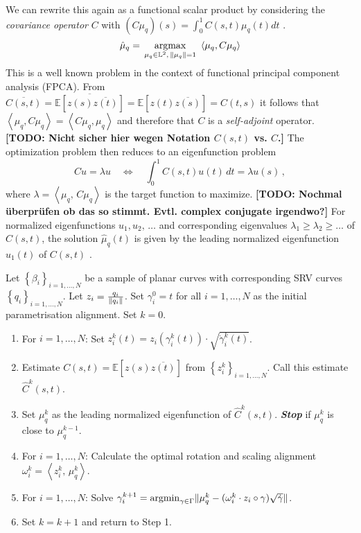 We can rewrite this again as a functional scalar product by considering the \emph{covariance operator} $C$ with $(C\mu_q)(s) = \int_0^1 C(s,t) \mu_q(t) dt$ \parencite[see][153]{RamsaySilverman2005}.
\begin{equation}
  \label{eq:quadr_opt}
  \hat\mu_q = \, \operatorname*{argmax}_{\mu_q \in \mathbb{L}^2,\,\lVert\mu_q\rVert = 1}\,\,
    \left\langle \mu_q, C\mu_q \right\rangle
\end{equation}
This is a well known problem in the context of functional principal component analysis (FPCA).
From $\overline{C(s,t)} = \overline{\mathbb{E}[z(s)\overline{z(t)}]} = \mathbb{E}[z(t)\overline{z(s)}] = C(t,s)$ it follows that $\left\langle \mu_q, C \mu_q \right\rangle = \left\langle C \mu_q, \mu_q \right\rangle$ and therefore that $C$ is a \emph{self-adjoint} operator.
\textbf{[TODO: Nicht sicher hier wegen Notation $C(s,t)$ vs. $C$.]}
The optimization problem then reduces to an eigenfunction problem 
$$ Cu = \lambda u \quad \Leftrightarrow \quad \int_0^1 C(s, t) u(t)\, dt = \lambda u(s)\,,$$
where $\lambda = \left\langle \mu_q,\, C \mu_q \right\rangle$ is the target function to maximize.
\textbf{[TODO: Nochmal überprüfen ob das so stimmt. Evtl. complex conjugate irgendwo?]}
For normalized eigenfunctions $u_1, u_2,\,\dots$ and corresponding eigenvalues $\lambda_1 \geq \lambda_2 \geq \dots$ of $C(s,t)$, the solution $\hat\mu_q(t)$ is given by the leading normalized eigenfunction $u_1(t)$ of $C(s,t)$ \parencite[see][153,397]{RamsaySilverman2005}.

\begin{algorithm}
  \label{algo:mean}
  Let $\left\{\beta_i\right\}_{i=1,\dots,N}$ be a sample of planar curves with corresponding SRV curves $\left\{ q_i \right\}_{i=1,\dots,N}$.
  Let $z_i = \frac{q_i}{\lVert q_i\rVert}$.
  Set $\gamma_i^0 = t$ for all $i=1,\dots,N$ as the initial parametrisation alignment.
  Set $k = 0$. 
  \begin{enumerate}
    \item For $i=1,\dots,N$: Set $z_i^k(t) = z_i\left(\gamma^k_i(t)\right) \cdot \sqrt{\dot\gamma_i^k(t)}$.
    \item Estimate $C(s,t) = \mathbb{E}[z(s)\overline{z(t)}]$ from $\left\{z_i^k\right\}_{i=1,\dots,N}$. Call this estimate $\hat{C}^k(s,t)$.
    \item Set $\mu_q^k$ as the leading normalized eigenfunction of $\hat{C}^k(s,t)$. \emph{\textbf{Stop}} if $\mu_q^k$ is close to $\mu_q^{k-1}$.
    \item For $i=1,\dots,N$: Calculate the optimal rotation and scaling alignment $\omega^k_i = \left\langle z_i^k,\, \mu_q^k \right\rangle$.
    \item For $i=1,\dots,N$: Solve $\gamma_i^{k+1} = \operatorname*{argmin}_{\gamma \in \Gamma} \lVert\mu_q^k - (\omega_i^k \cdot z_i \circ \gamma ) \sqrt{\dot\gamma}\rVert$.
    \item Set $k = k+1$ and return to Step 1.
  \end{enumerate}
\end{algorithm}

